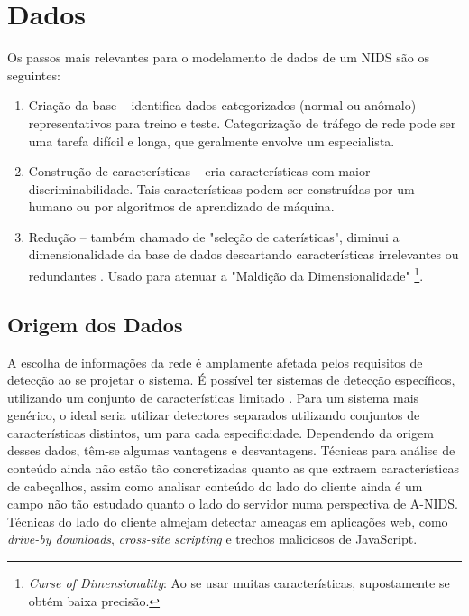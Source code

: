 \chapter{Dados}
\label{ch:dados}
Os passos mais relevantes para o modelamento de dados de um NIDS são os seguintes:
\begin{enumerate}
    \item Criação da base -- identifica dados categorizados (normal ou anômalo) representativos para treino e teste.
    Categorização de tráfego de rede pode ser uma tarefa difícil e longa, que geralmente envolve um especialista.
    \item Construção de características -- cria características com maior discriminabilidade. Tais características
    podem ser construídas por um humano ou por algoritmos de aprendizado de máquina.
    \item Redução -- também chamado de "seleção de caterísticas", diminui a dimensionalidade da base de dados
    descartando características irrelevantes ou redundantes \cite{song13}. Usado para atenuar a "Maldição da
    Dimensionalidade" \footnote{\textit{Curse of Dimensionality}: Ao se usar muitas características,
    supostamente se obtém baixa precisão.}.
\end{enumerate}


\section{Origem dos Dados}
A escolha de informações da rede é amplamente afetada pelos requisitos de detecção ao se projetar o sistema.
É possível ter sistemas de detecção específicos, utilizando um conjunto de características limitado \cite{guanzhong09}.
Para um sistema mais genérico, o ideal seria utilizar detectores separados utilizando conjuntos de características
distintos, um para cada especificidade. Dependendo da origem desses dados, têm-se algumas vantagens e desvantagens.
Técnicas para análise de conteúdo ainda não estão tão concretizadas quanto as que extraem características de
cabeçalhos, assim como analisar conteúdo do lado do cliente ainda é um campo não tão estudado quanto o lado do servidor
numa perspectiva de A-NIDS. Técnicas do lado do cliente almejam detectar ameaças em aplicações web, como \textit{drive-by
downloads}, \textit{cross-site scripting} e trechos maliciosos de JavaScript.

